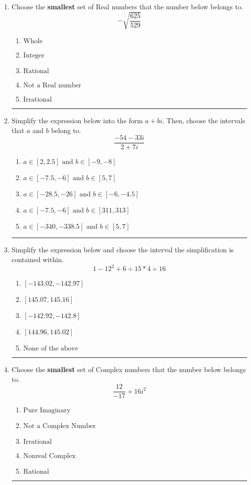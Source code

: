 \documentclass[14pt]{extbook}
\newcommand{\litem}[1]{\item#1\hspace*{-1cm}\rule{\textwidth}{0.4pt}}
\begin{document}
\begin{enumerate}
{\begin{enumerate}[label=\Alph*.]
\end{enumerate} }
\litem{
Choose the \textbf{smallest} set of Real numbers that the number below belongs to.\[ -\sqrt{\frac{625}{529}} \]\begin{enumerate}[label=\Alph*.]
\item \( \text{Whole} \)
\item \( \text{Integer} \)
\item \( \text{Rational} \)
\item \( \text{Not a Real number} \)
\item \( \text{Irrational} \)

\end{enumerate} }
\litem{
Simplify the expression below into the form $a+bi$. Then, choose the intervals that $a$ and $b$ belong to.\[ \frac{-54 - 33 i}{2 + 7 i} \]\begin{enumerate}[label=\Alph*.]
\item \( a \in [2, 2.5] \text{ and } b \in [-9, -8] \)
\item \( a \in [-7.5, -6] \text{ and } b \in [5, 7] \)
\item \( a \in [-28.5, -26] \text{ and } b \in [-6, -4.5] \)
\item \( a \in [-7.5, -6] \text{ and } b \in [311, 313] \)
\item \( a \in [-340, -338.5] \text{ and } b \in [5, 7] \)

\end{enumerate} }
\litem{
Simplify the expression below and choose the interval the simplification is contained within.\[ 1 - 12^2 + 6 \div 15 * 4 \div 16 \]\begin{enumerate}[label=\Alph*.]
\item \( [-143.02, -142.97] \)
\item \( [145.07, 145.16] \)
\item \( [-142.92, -142.8] \)
\item \( [144.96, 145.02] \)
\item \( \text{None of the above} \)

\end{enumerate} }
\litem{
Choose the \textbf{smallest} set of Complex numbers that the number below belongs to.\[ \frac{12}{-17}+16i^2 \]\begin{enumerate}[label=\Alph*.]
\item \( \text{Pure Imaginary} \)
\item \( \text{Not a Complex Number} \)
\item \( \text{Irrational} \)
\item \( \text{Nonreal Complex} \)
\item \( \text{Rational} \)


\end{enumerate}}
\end{enumerate}
\end{document}
